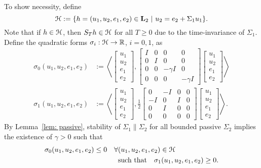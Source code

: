 \documentclass{ifacconf}
\def\Real{\mathbb{R}} \def\Ints{\mathbb{Z}} \def\Natural{\mathbb{N}}
\newcommand{\Ltwo}{\boldsymbol{\rm L}_{2}}
\theoremstyle{definition}
\begin{document}
\begin{pf}
To show necessity, define 
\[
\HH := \{h = (u_1, u_2, e_1, e_2) \in \Ltwo\ |\ u_2 = e_2 + \Sigma_1 u_1\}.
\]
Note that if $h \in \mathcal{H}$, then $S_T h \in \mathcal{H}$ for all $T \geq 0$ due to the time-invariance of $\Sigma_1$. Define the quadratic forms $\sigma_i : \HH
\to \Real$, $i = 0, 1$, as 
\begin{align*}
 \sigma_0(u_1, u_2, e_1, e_2) & := \left\langle 
\begin{bmatrix} 
 u_1 \\
 u_2 \\
 e_1 \\
 e_2
\end{bmatrix},
\begin{bmatrix}
I & 0 & 0 & 0 \\
0 & I & 0 & 0 \\
0 & 0 & -\gamma I & 0 \\
0 & 0 & 0 & -\gamma I
\end{bmatrix}
\begin{bmatrix} 
 u_1 \\
 u_2 \\
 e_1 \\
 e_2
\end{bmatrix}
\right\rangle \\
 \sigma_1(u_1, u_2, e_1, e_2) & := \left\langle 
\begin{bmatrix} 
 u_1 \\
 u_2 \\
 e_1 \\
 e_2
\end{bmatrix},
\frac{1}{2} \begin{bmatrix}
0 & -I & 0 & 0 \\
-I & 0 & I & 0 \\
0 & I &0 & 0 \\
0 & 0 & 0 & 0
\end{bmatrix}
\begin{bmatrix} 
 u_1 \\
 u_2 \\
 e_1 \\
 e_2
\end{bmatrix}
\right\rangle.
\end{align*}
By Lemma~\ref{lem: passive}, stability of
$\Sigma_1 \| \Sigma_2$ for all bounded passive $\Sigma_2$ implies the existence of $\gamma >0$ such that
\begin{align*}
 \sigma_0(u_1, u_2, e_1, e_2) \leq 0 \quad \forall & (u_1, u_2, e_1, e_2) \in \HH \\
 & \text{such that} \quad \sigma_1(u_1, u_2, e_1, e_2) \geq 0.

\end{align*}
\end{pf}
\end{document}
